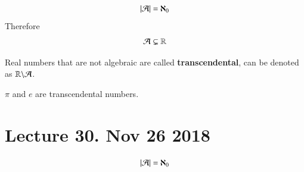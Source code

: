 \documentclass[10pt]{article}
\begin{document}
		\begin{theorem}
			\[
				|\mathcal{{A}}| = \aleph_0
			\]
			Therefore 
			\[
				\mathcal{{A}} \subsetneq \mathbb{R}
			\]
		\end{theorem}
		
		\begin{definition}
			Real numbers that are not algebraic are called \textbf{transcendental}, can be denoted as $\mathbb{R} \backslash \mathcal{{A}}$.
		\end{definition}
		
		\begin{example}
			$\pi$ and $e$ are transcendental numbers.
		\end{example}
	\section{Lecture 30. Nov 26 2018}
		\begin{theorem}
			\[
				|\mathcal{{A}}| = \aleph_0
			\]
		\end{theorem}
\end{document}
